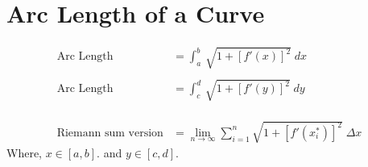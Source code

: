 \section{Arc Length of a Curve}

\begin{framed}
  \begin{align*}
    \text{Arc Length } &= \int_a^b \, \sqrt{1 + \left[f'(x)\right]^2} \; dx\\\\
    \text{Arc Length } &= \int_c^d \, \sqrt{1 + \left[f'(y)\right]^2} \; dy\\\\\\\\
    \text{Riemann sum version} &= \lim_{n \to \infty} \sum_{i=1}^{n} 
    \sqrt{1 + \left[f'(x_{i}^{*})\right]^2} \; \Delta x 
  \end{align*}
  Where, $x \in [a, b].$ and $y \in [c, d].$
\end{framed}
